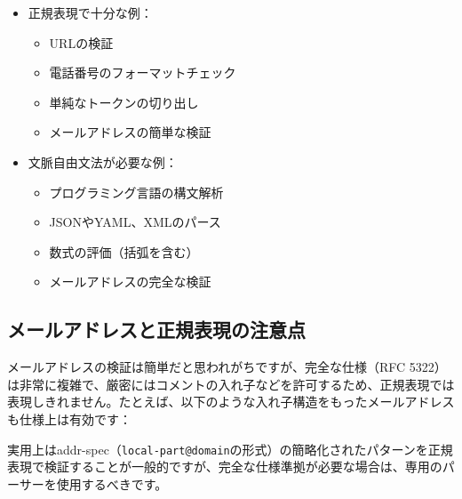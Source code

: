\begin{itemize}
\tightlist
\item
  正規表現で十分な例：

  \begin{itemize}
  \tightlist
  \item
    URLの検証
  \item
    電話番号のフォーマットチェック
  \item
    単純なトークンの切り出し
  \item
    メールアドレスの簡単な検証
  \end{itemize}
\item
  文脈自由文法が必要な例：

  \begin{itemize}
  \tightlist
  \item
    プログラミング言語の構文解析
  \item
    JSONやYAML、XMLのパース
  \item
    数式の評価（括弧を含む）
  \item
    メールアドレスの完全な検証
  \end{itemize}
\end{itemize}

\hypertarget{chapter4-ux30e1ux30fcux30ebux30a2ux30c9ux30ecux30b9ux3068ux6b63ux898fux8868ux73feux306eux6ce8ux610fux70b9}{%
\subsection{メールアドレスと正規表現の注意点}\label{chapter4-ux30e1ux30fcux30ebux30a2ux30c9ux30ecux30b9ux3068ux6b63ux898fux8868ux73feux306eux6ce8ux610fux70b9}}

メールアドレスの検証は簡単だと思われがちですが、完全な仕様（RFC
5322）は非常に複雑で、厳密にはコメントの入れ子などを許可するため、正規表現では表現しきれません。たとえば、以下のような入れ子構造をもったメールアドレスも仕様上は有効です：

\begin{Shaded}
\begin{Highlighting}[]
\end{Highlighting}
\end{Shaded}

実用上はaddr-spec（\texttt{local-part@domain}の形式）の簡略化されたパターンを正規表現で検証することが一般的ですが、完全な仕様準拠が必要な場合は、専用のパーサーを使用するべきです。

